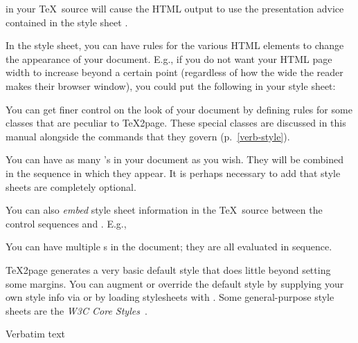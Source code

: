 \n in your \TeX\ source will cause the HTML output to
use the presentation advice contained in the
style sheet .

In the style sheet, you can have rules for the various
HTML elements to change the appearance of your
document.  E.g., if you do not want your HTML page
width to increase beyond a certain point (regardless of
how the wide the reader makes their browser window),
you could put the following in your style sheet:


You can get finer control on the look of your document
by defining rules for some classes that are peculiar to
\TeX2page.  These special classes
are discussed in this manual alongside the commands
that they govern (p.~\ref{verb-style}).

You can have as many ’s in your
document as you wish.  They will be combined in
the sequence in which they appear.  It is perhaps
necessary to add that style sheets are completely
optional.


You can also {\em embed} style sheet information
in the \TeX\ source between the control sequences
\p{\cssblock} and \p{\endcssblock}.  E.g.,


\n You can
have multiple \p{\cssblock}s in the document; they
are all evaluated in sequence.

\TeX2page generates a very basic default style
that
does little beyond setting some margins.  You
can augment or override the default style by supplying your
own style info via \p{\cssblock} or by loading
stylesheets with .   Some general-purpose
style sheets are the {\em W3C Core
Styles}~\cite{w3ccorestyles}.

 Verbatim text

